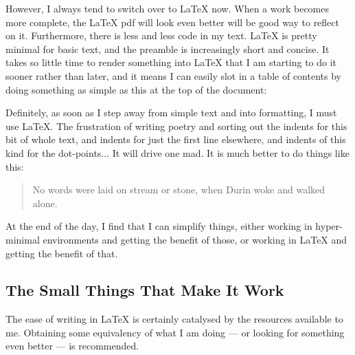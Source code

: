 \documentclass[12pt, oneside]{memoir}
\begin{document}
However, I always tend to switch over to LaTeX now. When a work becomes more complete, the LaTeX pdf will look even better will be good way to reflect on it. Furthermore, there is less and less code in my text. LaTeX is pretty minimal for basic text, and the preamble is increasingly short and concise. It takes so little time to render something into LaTeX that I am starting to do it sooner rather than later, and it means I can easily slot in a table of contents by doing something as simple as this at the top of the document:

\begin{verbatim*}
    \tableofcontents
\end{verbatim*}

Definitely, as soon as I step away from simple text and into formatting, I must use LaTeX. The frustration of writing poetry and sorting out the indents for this bit of whole text, and indents for just the first line elsewhere, and indents of this kind for the dot-points... It will drive one mad. It is much better to do things like this:

\begin{verbatim*}
    \begin{verse}
        No words were laid on stream or stone,
        when Durin woke and walked alone.
    \end{verse}
\end{verbatim*}

At the end of the day, I find that I can simplify things, either working in hyper-minimal environments and getting the benefit of those, or working in LaTeX and getting the benefit of that.

\subsection{The Small Things That Make It Work}

The ease of writing in LaTeX is certainly catalysed by the resources available to me. Obtaining some equivalency of what I am doing — or looking for something even better — is recommended.
\end{document}
